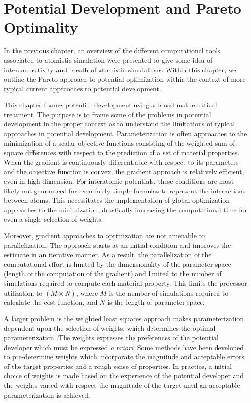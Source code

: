 \chapter{Potential Development and Pareto Optimality}

In the previous chapter, an overview of the different computational tools associated to atomistic simulation were presented to give some idea of interconnectivity and breath of atomistic simulations.  Within this chapter, we outline the Pareto approach to potential optimization within the context of more typical current appraoches to potential development.

This chapter frames potential development using a broad mathematical treatment.  The purpose is to frame some of the problems in potential development in the proper context as to understand the limitations of typical approaches in potential development.  Parameterization is often approaches to the minimization of a scalar objective functions consisting of the weighted sum of square differences with respect to the prediction of a set of material properties.  When the gradient is continuously differentiable with respect to its parameters and the objective function is convex, the gradient approach is relatively efficient, even in high dimension.  For interatomic potentials, these conditions are most likely not guaranteed for even fairly simple formulas to represent the interactions between atoms.  This necessitates the implementation of global optimization approaches to the minimization, drastically increasing the computational time for even a single selection of weights.

Moreover, gradient approaches to optimization are not amenable to parallelization.  The approach starts at an initial condition and improves the estimate in an iterative manner.  As a result, the parallelization of the computational effort is limited by the dimensionality of the parameter space (length of the computation of the gradient) and limited to the number of simulations required to compute each material property.  This limits the processor utilization to $(M \times N)$, where $M$ is the number of simulations required to calculate the cost function, and $N$ is the length of parameter space.

A larger problem is the weighted least squares approach makes parameterization dependent upon the selection of weights, which determines the optimal parameterization.   The weights expresses the preferences of the potential developer which must be expressed \emph{a priori}.  Some methods have been developed to pre-determine weights which incorporate the magnitude and acceptable errors of the target properties and a rough sense of properties.  In practice, a initial choice of weights is made based on the experience of the potential developer and the weights varied with respect the magnitude of the target until an acceptable parameterization is achieved.

